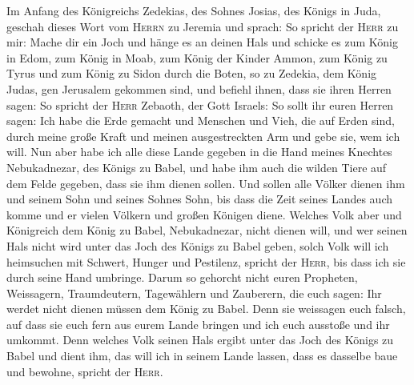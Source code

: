  Im Anfang des Königreichs Zedekias, des Sohnes Josias,
des Königs in Juda, geschah dieses Wort vom \textsc{Herrn} zu Jeremia
und sprach:  So spricht der \textsc{Herr} zu mir: Mache
dir ein Joch und hänge es an deinen Hals  und schicke es
zum König in Edom, zum König in Moab, zum König der Kinder Ammon, zum
König zu Tyrus und zum König zu Sidon durch die Boten, so zu Zedekia,
dem König Judas, gen Jerusalem gekommen sind,  und befiehl
ihnen, dass sie ihren Herren sagen: So spricht der \textsc{Herr}
Zebaoth, der Gott Israels: So sollt ihr euren Herren sagen:
 Ich habe die Erde gemacht und Menschen und Vieh, die auf
Erden sind, durch meine große Kraft und meinen ausgestreckten Arm und
gebe sie, wem ich will.  Nun aber habe ich alle diese
Lande gegeben in die Hand meines Knechtes Nebukadnezar, des Königs zu
Babel, und habe ihm auch die wilden Tiere auf dem Felde gegeben, dass
sie ihm dienen sollen.  Und sollen alle Völker dienen ihm
und seinem Sohn und seines Sohnes Sohn, bis dass die Zeit seines Landes
auch komme und er vielen Völkern und großen Königen diene.
 Welches Volk aber und Königreich dem König zu Babel,
Nebukadnezar, nicht dienen will, und wer seinen Hals nicht wird unter
das Joch des Königs zu Babel geben, solch Volk will ich heimsuchen mit
Schwert, Hunger und Pestilenz, spricht der \textsc{Herr}, bis dass ich
sie durch seine Hand umbringe.  Darum so gehorcht nicht
euren Propheten, Weissagern, Traumdeutern, Tagewählern und Zauberern,
die euch sagen: Ihr werdet nicht dienen müssen dem König zu Babel.
 Denn sie weissagen euch falsch, auf dass sie euch fern
aus eurem Lande bringen und ich euch ausstoße und ihr umkommt.
 Denn welches Volk seinen Hals ergibt unter das Joch des
Königs zu Babel und dient ihm, das will ich in seinem Lande lassen, dass
es dasselbe baue und bewohne, spricht der \textsc{Herr}.

